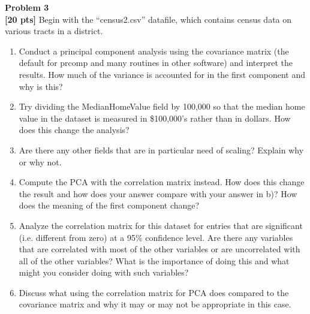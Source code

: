 \documentclass{article}
\newenvironment{problem}[2][Problem]
    { \begin{mdframed}[backgroundcolor=gray!20] \textbf{#1 #2} \\}
    {  \end{mdframed}}
\begin{document}
\newpage
\begin{problem}{3}
\textbf{[20 pts]}
Begin with the “census2.csv” datafile, which contains census data on various tracts in a district.
\begin{enumerate}
\item Conduct a principal component analysis using the covariance matrix (the default for prcomp and many routines in other software) and interpret the results. How much of the variance is accounted for in the first component and why is this?
\item Try dividing the MedianHomeValue field by 100,000 so that the median home value in the dataset is measured in \$100,000’s rather than in dollars. How does this change the analysis?
\item Are there any other fields that are in particular need of scaling? Explain why or why not.
\item Compute the PCA with the correlation matrix instead. How does this change the result and how does your answer compare with your answer in b)? How does the meaning of the first component change?
\item Analyze the correlation matrix for this dataset for entries that are significant (i.e. different from zero) at a 95\% confidence level. Are there any variables that are correlated with most of the other variables or are uncorrelated with all of the other variables? What is the importance of doing this and what might you consider doing with such variables?
\item Discuss what using the correlation matrix for PCA does compared to the covariance matrix and why it may or may not be appropriate in this case.
\end{enumerate}
\end{problem}
\end{document}
